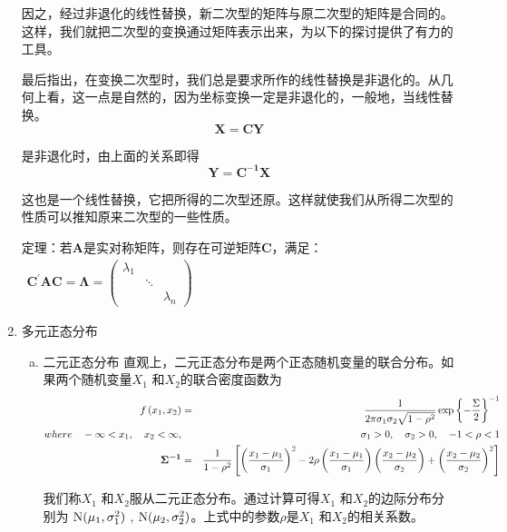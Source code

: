 \begin{enumerate}[ 1) ]
        因之，经过非退化的线性替换，新二次型的矩阵与原二次型的矩阵是合同的。这样，我们就把二次型的变换通过矩阵表示出来，为以下的探讨提供了有力的工具。
        	
        最后指出，在变换二次型时，我们总是要求所作的线性替换是非退化的。从几何上看，这一点是自然的，因为坐标变换一定是非退化的，一般地，当线性替换。
        $$ \boldsymbol{ X = CY } $$

        是非退化时，由上面的关系即得
        $$ \boldsymbol{ Y = C^{-1}X } $$
        
        这也是一个线性替换，它把所得的二次型还原。这样就使我们从所得二次型的性质可以推知原来二次型的一些性质。
        \begin{theorem}
			定理：若$ \boldsymbol{ A } $是实对称矩阵，则存在可逆矩阵$ \boldsymbol{C} $，满足： 
			$ \begin{array}{l}
				\boldsymbol{ C^{\prime} A C}  = \boldsymbol{ \Lambda }=  \left(
					\begin{array}{ccc}
						\lambda_{1}               \\
						&            \ddots      &\\
						&              &      \lambda_{n}
					\end{array} \right)
			\end{array} $
		\end{theorem}
       \item 多元正态分布
       		\begin{enumerate}[a)]
       			\item 二元正态分布
       			\setlength{\parindent}{2\ccwd}
       			直观上，二元正态分布是两个正态随机变量的联合分布。如果两个随机变量$ X_1 $ 和$ X_2 $的联合密度函数为
					\begin{eqnarray}
					f\left(x_{1}, x_{2}\right) & =  &\frac{1}{2 \pi \sigma_{1} \sigma_{2} \sqrt{1-\rho^{2}}} 
					\exp \left\{-\frac{\Sigma }{2}\right\}^{-1} \notag \\
					where \quad -\infty<x_{1}, \quad x_{2}<\infty, &  &\quad \sigma_{1}>0, \quad \sigma_{2}>0, \quad-1<\rho<1 \notag \\
					\boldsymbol{\Sigma^{-1} } & = & \frac{1}{1-\rho^{2}} 
					\left[\left(\frac{x_{1}-\mu_{1}}{\sigma_{1}}\right)^{2}-2 \rho\left(\frac{x_{1}-\mu_{1}}{\sigma_{1}}\right)\left(\frac{x_{2}-\mu_{2}}{\sigma_{2}}\right)+\left(\frac{x_{2}-\mu_{2}}{\sigma_{2}}\right)^{2}\right] \notag
       			\end{eqnarray}
       			
				我们称$ X_1 $ 和$ X_2 $服从二元正态分布。通过计算可得$ X_1 $ 和$ X_2 $的边际分布分别为
				   $ \rm N(\mu_{1} ,\sigma_{1}^{2})$ , $ \rm N(\mu_{2} ,\sigma_{2}^{2})$。上式中的参数$ \rho $是$ X_1 $ 和$ X_2 $的相关系数。
       			

\end{enumerate}
\end{enumerate}
